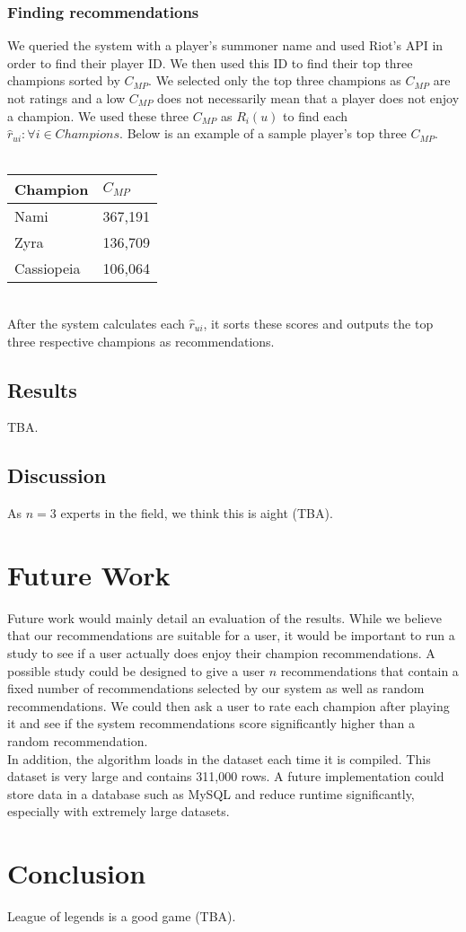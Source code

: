 \documentclass [11pt]{IEEEtran}
\begin{document}
\subsubsection{Finding recommendations}
We queried the system with a player's summoner name and used Riot's API in order to find their player ID. We then used this ID to find their top three champions sorted by $C_{MP}$. We selected only the top three champions as $C_{MP}$ are not ratings and a low $C_{MP}$ does not necessarily mean that a player does not enjoy a champion. We used these three $C_{MP}$ as $R_i(u)$ to find each $\hat{r}_{ui} : \forall i \in Champions$. Below is an example of a sample player's top three $C_{MP}$. \\\\
\begin{tabular}{| l | l |}
    \hline
    Champion & $C_{MP}$ \\ \hline
    Nami & 367,191  \\ 
    Zyra & 136,709 \\
    Cassiopeia & 106,064 \\
    \hline
\end{tabular}
\vspace{.2cm} \\ \noindent
After the system calculates each $\hat{r}_{ui}$, it sorts these scores and outputs the top three respective champions as recommendations. 
\subsection{Results}
TBA.
\subsection{Discussion}
As $n=3$ experts in the field, we think this is aight (TBA).
\section{Future Work}
Future work would mainly detail an evaluation of the results. While we believe that our recommendations are suitable for a user, it would be important to run a study to see if a user actually does enjoy their champion recommendations. A possible study could be designed to give a user $n$ recommendations that contain a fixed number of recommendations selected by our system as well as random recommendations. We could then ask a user to rate each champion after playing it and see if the system recommendations score significantly higher than a random recommendation. \\ \indent In addition, the algorithm loads in the dataset each time it is compiled. This dataset is very large and contains 311,000 rows. A future implementation could store data in a database such as MySQL and reduce runtime significantly, especially with extremely large datasets. 
\section{Conclusion}
League of legends is a good game (TBA).
\nocite{*}


\end{document}
